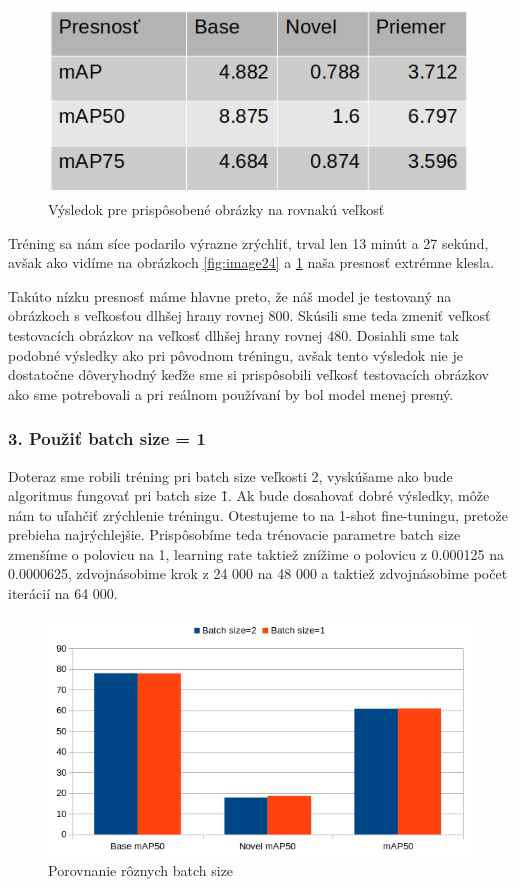 \begin{figure}[H]
\centering
\includegraphics[width=\textwidth]{images/same_size_table.png}
\caption{Výsledok pre prispôsobené obrázky na rovnakú veľkosť}
\label{fig:image0}
\end{figure}

Tréning sa nám síce podarilo výrazne zrýchliť, trval len 13 minút a 27 sekúnd, avšak ako vidíme na obrázkoch \ref{fig:image24} a \ref{fig:image0} naša presnosť extrémne klesla. 

Takúto nízku presnosť máme hlavne preto, že náš model je testovaný na obrázkoch s veľkosťou dlhšej hrany rovnej 800. Skúsili sme teda zmeniť veľkosť testovacích obrázkov na veľkosť dlhšej hrany rovnej 480. Dosiahli sme tak podobné výsledky ako pri pôvodnom tréningu, avšak tento výsledok nie je dostatočne dôveryhodný keďže sme si prispôsobili veľkosť testovacích obrázkov ako sme potrebovali a pri reálnom používaní by bol model menej presný. 

\subsubsection{3. Použiť batch size = 1}

Doteraz sme robili tréning pri batch size veľkosti 2, vyskúšame ako bude algoritmus fungovať pri batch size \= 1. Ak bude dosahovať dobré výsledky, môže nám to uľahčiť zrýchlenie tréningu. Otestujeme to na 1-shot fine-tuningu, pretože prebieha najrýchlejšie. Prispôsobíme teda trénovacie parametre batch size zmenšíme o polovicu na 1, learning rate taktiež znížime o polovicu z 0.000125 na 0.0000625, zdvojnásobime krok z 24 000 na 48 000 a taktiež zdvojnásobime počet iterácií na 64 000.

\begin{figure}[H]
\centering
\includegraphics[width=\textwidth]{images/batch_size_comparison.png}
\caption{Porovnanie rôznych batch size}
\label{fig:image9}
\end{figure}


